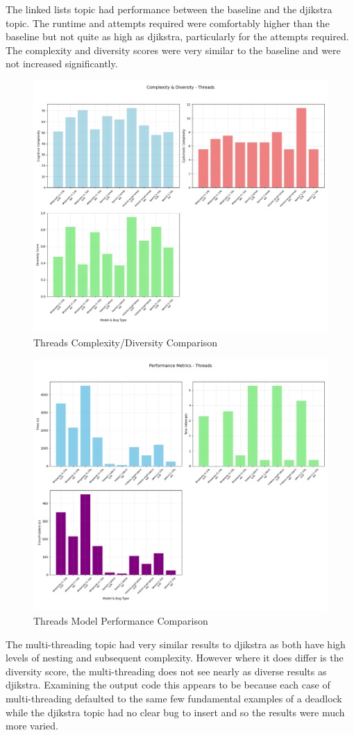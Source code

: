 \documentclass[12pt]{extarticle}
\begin{document}
The linked lists topic had performance between the baseline and the djikstra topic. The runtime and attempts required were comfortably higher than the baseline but not quite as high as djikstra, particularly for the attempts required. The complexity and diversity scores were very similar to the baseline and were not increased significantly. 

\begin{figure}[H]
\centering
\includegraphics[width=0.65\linewidth]{Images/Complexity_Comparison_Threads.png}
\caption{Threads Complexity/Diversity Comparison}
\label{fig:Complexity_Comparison_Threads}
\end{figure}

\begin{figure}[H]
\centering
\includegraphics[width=0.65\linewidth]{Images/Model_Comparison_Threads.png}
\caption{Threads Model Performance Comparison}
\label{fig:Model_Comparison_Threads}
\end{figure}



The multi-threading topic had very similar results to djikstra as both have high levels of nesting and subsequent complexity. However where it does differ is the diversity score, the multi-threading does not see nearly as diverse results as djikstra. Examining the output code this appears to be because each case of multi-threading defaulted to the same few fundamental examples of a deadlock while the djikstra topic had no clear bug to insert and so the results were much more varied.
\end{document}
